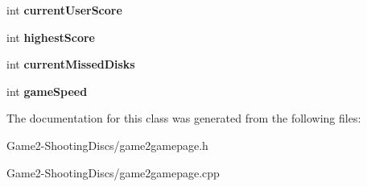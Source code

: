\begin{DoxyCompactItemize}
\item 
\mbox{\label{classGame2GamePage_a6ae91699d52d4abbb1389c32783a8811}} 
int {\bfseries current\+User\+Score}
\item 
\mbox{\label{classGame2GamePage_a16df537c73a716c4bf89501f69607e73}} 
int {\bfseries highest\+Score}
\item 
\mbox{\label{classGame2GamePage_a393ec7e7ef754088c366f23b6adb3ff4}} 
int {\bfseries current\+Missed\+Disks}
\item 
\mbox{\label{classGame2GamePage_aec78bd876102c2aed0b07785dfdf2017}} 
int {\bfseries game\+Speed}
\end{DoxyCompactItemize}


The documentation for this class was generated from the following files\+:\begin{DoxyCompactItemize}
\item 
Game2-\/\+Shooting\+Discs/game2gamepage.\+h\item 
Game2-\/\+Shooting\+Discs/game2gamepage.\+cpp\end{DoxyCompactItemize}
